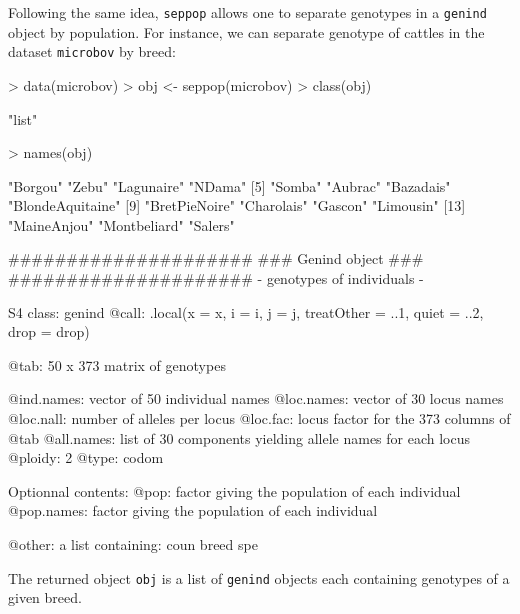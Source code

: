 \documentclass{article}
\begin{document}
Following the same idea, \texttt{seppop} allows one to separate genotypes
in a \texttt{genind} object by population.
For instance, we can separate genotype of cattles in the dataset \texttt{microbov}
by breed:
\begin{Schunk}
\begin{Sinput}
> data(microbov)
> obj <- seppop(microbov)
> class(obj)
\end{Sinput}
\begin{Soutput}
[1] "list"
\end{Soutput}
\begin{Sinput}
> names(obj)
\end{Sinput}
\begin{Soutput}
 [1] "Borgou"          "Zebu"            "Lagunaire"       "NDama"          
 [5] "Somba"           "Aubrac"          "Bazadais"        "BlondeAquitaine"
 [9] "BretPieNoire"    "Charolais"       "Gascon"          "Limousin"       
[13] "MaineAnjou"      "Montbeliard"     "Salers"         
\end{Soutput}
\begin{Soutput}
   #####################
   ### Genind object ### 
   #####################
- genotypes of individuals - 

S4 class:  genind
@call: .local(x = x, i = i, j = j, treatOther = ..1, quiet = ..2, drop = drop)

@tab:  50 x 373 matrix of genotypes

@ind.names: vector of  50 individual names
@loc.names: vector of  30 locus names
@loc.nall: number of alleles per locus
@loc.fac: locus factor for the  373 columns of @tab
@all.names: list of  30 components yielding allele names for each locus
@ploidy:  2
@type:  codom

Optionnal contents: 
@pop:  factor giving the population of each individual
@pop.names:  factor giving the population of each individual

@other: a list containing: coun  breed  spe 
\end{Soutput}
\end{Schunk}

\noindent The returned object \texttt{obj} is a list of \texttt{genind}
objects each containing genotypes of a given breed.
\end{document}
